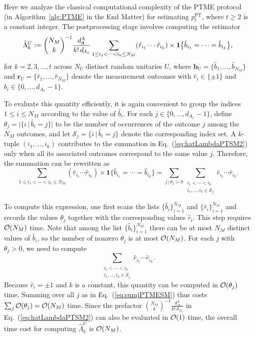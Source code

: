 \documentclass[aps,prl,twocolumn,nofootinbib,superscriptaddress,10pt]{revtex4-2}
\let\originalleft\left
\let\originalright\right
\renewcommand{\left}{\mathopen{}\mathclose\bgroup\originalleft}
\renewcommand{\right}{\aftergroup\egroup\originalright}
\newcommand{\bigo}[1]{\mathcal{O}\left(#1\right)}
\theoremstyle{plain}
\theoremstyle{definition}
\newcommand{\PT}{\mathrm{PT}}
\newcommand{\eref}[1]{Eq.~\textup{(\ref{#1})}}
\begin{document}
Here we analyze the classical computational complexity of the PTME protocol (in Algorithm~\ref{alg:PTME} in the End Matter) for estimating $p_t^{\PT}$, where $t\geq 2$ is a constant integer. 
The postprocessing stage involves computing the estimator
\begin{align}\label{eq:hatLambdaPTSM2}
\hat{\Lambda}_k^{U}
	:= \binom{N_M}{k}^{-1} \frac{d_{\!A}^{\,k}}{k!\, d_{\!A_1} }
	\sum_{1\leq i_1 <\dots < i_k \leq N_M} \left( \hat{r}_{i_1}\cdots \hat{r}_{i_k} \right) \times  \textbf{1}\big\{\hat{b}_{i_1}=\dots=\hat{b}_{i_k}\big\}, 
\end{align}
for $k=2,3,\dots,t$ across $N_U$ distinct random unitaries $U$, 
 where
$\mathbf{b}_{U} = \big\{\hat{b}_1, \dots, \hat{b}_{N_M}\big\}$ and $\mathbf{r}_{U} = \{\hat{r}_1, \dots, \hat{r}_{N_M}\}$ denote the measurement outcomes with $\hat r_i\in\{\pm1\}$ and $\hat b_i\in\{0,\dots,d_{A_1}-1\}$. 


To evaluate this quantity efficiently, it is again convenient to group the
indices $1\le i\le N_M$ according to the value of $\hat b_i$.
For each $j\in\{0,\ldots,d_{A_1}-1\}$, define
$\theta_j = \bigl|\{i\,|\,\hat b_i=j\}\bigr|$ 
to be the number of occurrences of the outcome $j$ among the $N_M$ outcomes, and let $\mathcal S_j=\{i\,|\,\hat b_i=j\}$ 
denote the corresponding index set.
A $k$-tuple $(i_1,\ldots,i_k)$ contributes to the summation in
\eref{eq:hatLambdaPTSM2} only when all its associated outcomes  correspond to the same value
$j$.
Therefore, the summation can be rewritten as
\begin{equation}\label{eq:sumjPTMESM}
\sum_{1\le i_1<\cdots<i_k\le N_M}
(\hat r_{i_1}\cdots \hat r_{i_k})\times 
\mathbf 1\{\hat b_{i_1}=\cdots=\hat b_{i_k}\}
=
\sum_{j\,|\,\theta_j>0}
\sum_{\substack{i_1<\cdots<i_k\\ i_1,\dots,i_k\in \mathcal S_j}}
\hat r_{i_1}\cdots \hat r_{i_k}.
\end{equation}


To compute this expression, one first scans the lists
$\{\hat b_i\}_{i=1}^{N_M}$ and $\{\hat r_i\}_{i=1}^{N_M}$ and records the
values $\theta_j$ together with the corresponding values $\hat r_i$.
This step requires $\bigo{N_M}$ time.
Note that among the list $\{\hat b_i\}_{i=1}^{N_M}$ there can be at most $N_M$ distinct
values of $\hat b_i$, so the number of nonzero $\theta_j$ is at most $\bigo{N_M}$.
For each $j$ with $\theta_j>0$, we need to compute
\begin{equation}
\sum_{\substack{i_1<\cdots<i_k\\ i_1,\dots,i_k\in \mathcal S_j}}
\hat r_{i_1}\cdots \hat r_{i_k}.
\end{equation}
Because $\hat r_i=\pm1$ and $k$ is a constant, this quantity can be
computed in $\bigo{\theta_j}$ time.
Summing over all $j$ as in \eref{eq:sumjPTMESM} thus costs 
$\sum_j \bigo{\theta_j}=\bigo{N_M}$ time. 
Since the prefactor
$\binom{N_M}{k}^{-1}\frac{d_A^{\,k}}{k!\,d_{A_1}}$
in \eref{eq:hatLambdaPTSM2} can also be evaluated in $\bigo{1}$ time,
the overall time cost for computing $\hat{\Lambda}_k^U$ is $\bigo{N_M}$.
\end{document}
